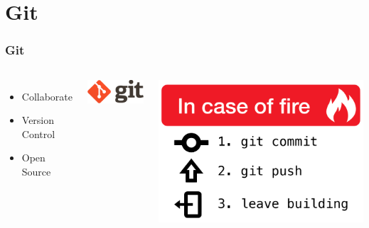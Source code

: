 
    
    \section{Git}
	\begin{frame}
		\frametitle{Git}
		\begin{columns}[c]
        		\begin{itemize}
					\item Collaborate
                    \item Version Control
                    \item Open Source
          		\end{itemize}
            	\centering
				\includegraphics[width=.7\linewidth,]{res/git}

				\vspace{1cm} %

				\includegraphics[width=.7\linewidth]{res/fire}
        \end{columns}
	\end{frame}
    
